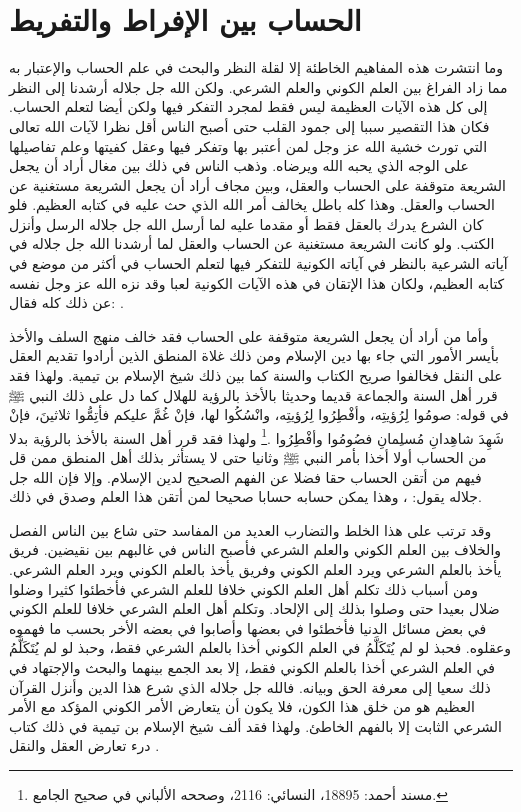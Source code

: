 \section{الحساب بين الإفراط والتفريط}

وما انتشرت هذه المفاهيم الخاطئة إلا لقلة النظر والبحث في علم الحساب والإعتبار به مما زاد الفراغ بين العلم الكوني والعلم الشرعي. ولكن الله جل جلاله أرشدنا إلى النظر إلى كل هذه الآيات العظيمة ليس فقط لمجرد التفكر فيها ولكن أيضا لتعلم الحساب. فكان هذا التقصير سببا إلى جمود القلب حتى أصبح الناس أقل نظرا لآيات الله تعالى التي تورث خشية الله عز وجل لمن أعتبر بها وتفكر فيها وعقل كفيتها وعلم تفاصيلها على الوجه الذي يحبه الله ويرضاه. وذهب الناس في ذلك بين مغال أراد أن يجعل الشريعة متوقفة على الحساب والعقل، وبين مجاف أراد أن يجعل الشريعة مستغنية عن الحساب والعقل. وهذا كله باطل يخالف أمر الله الذي حث عليه في كتابه العظيم. فلو كان الشرع يدرك بالعقل فقط أو مقدما عليه لما أرسل الله جل جلاله الرسل وأنزل الكتب. ولو كانت الشريعة مستغنية عن الحساب والعقل لما أرشدنا الله جل جلاله في آياته الشرعية بالنظر في آياته الكونية للتفكر فيها لتعلم الحساب في أكثر من موضع في كتابه العظيم، ولكان هذا الإتقان في هذه الآيات الكونية لعبا وقد نزه الله عز وجل نفسه عن ذلك كله فقال: \quranayah*[44][38-39] {\footnotesize (\surahname*[44])}.

وأما من أراد أن يجعل الشريعة متوقفة على الحساب فقد خالف منهج السلف والأخذ بأيسر الأمور التي جاء بها دين الإسلام ومن ذلك غلاة المنطق الذين أرادوا تقديم العقل على النقل فخالفوا صريح الكتاب والسنة كما بين ذلك شيخ الإسلام بن تيمية. ولهذا فقد قرر أهل السنة والجماعة قديما وحديثا بالأخذ بالرؤية للهلال كما دل على ذلك النبي ﷺ في قوله: صومُوا لِرُؤيتِه، وأفْطِرُوا لِرُؤيتِه، وانْسُكُوا لها، فإنْ غُمَّ عليكم فأتِمُّوا ثلاثينَ، فإنْ شَهِدَ شاهِدانِ مُسلِمانِ فصُومُوا وأفْطِرُوا \href{https://shamela.ws/book/25794/15398#p2}{\faExternalLink} \href{https://shamela.ws/book/21659/7259#p1}{\faExternalLink} \cite{ahmid}.\footnote{مسند أحمد: 18895، النسائي: 2116، وصححه الألباني في صحيح الجامع.} ولهذا فقد قرر أهل السنة بالأخذ بالرؤية بدلا من الحساب أولا أخذا بأمر النبي ﷺ وثانيا حتى لا يستأثر بذلك أهل المنطق ممن قل فيهم من أتقن الحساب حقا فضلا عن الفهم الصحيح لدين الإسلام. وإلا فإن الله جل جلاله يقول: \quranayah*[55][5]{\footnotesize \surahname*[55]}، وهذا يمكن حسابه حسابا صحيحا لمن أتقن هذا العلم وصدق في ذلك.

وقد ترتب على هذا الخلط والتضارب العديد من المفاسد حتى شاع بين الناس الفصل والخلاف بين العلم الكوني والعلم الشرعي فأصبح الناس في غالبهم بين نقيضين. فريق يأخذ بالعلم الشرعي ويرد العلم الكوني وفريق يأخذ بالعلم الكوني ويرد العلم الشرعي. ومن أسباب ذلك تكلم أهل العلم الكوني خلافا للعلم الشرعي فأخطئوا كثيرا وضلوا ضلال بعيدا حتى وصلوا بذلك إلى الإلحاد. وتكلم أهل العلم الشرعي خلافا للعلم الكوني في بعض مسائل الدنيا فأخطئوا في بعضها وأصابوا في بعضه الأخر بحسب ما فهموه وعقلوه. فحبذ لو لم يُتَكَلَّمُ في العلم الكوني أخذا بالعلم الشرعي فقط، وحبذ لو لم يُتَكَلَّمُ في العلم الشرعي أخذا بالعلم الكوني فقط، إلا بعد الجمع بينهما والبحث والإجتهاد في ذلك سعيا إلى معرفة الحق وبيانه. فالله جل جلاله الذي شرع هذا الدين وأنزل القرآن العظيم هو من خلق هذا الكون، فلا يكون أن يتعارض الأمر الكوني المؤكد مع الأمر الشرعي الثابت إلا بالفهم الخاطئ. ولهذا فقد ألف شيخ الإسلام بن تيمية في ذلك كتاب درء تعارض العقل والنقل \cite{ibnTaimia_DTAWN}.

